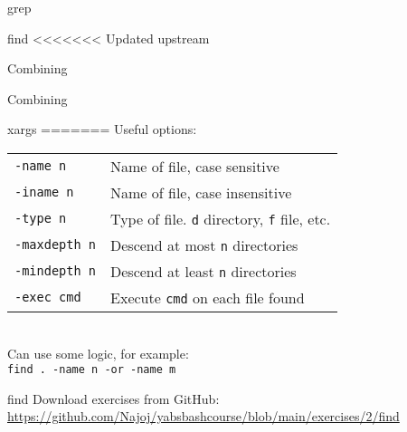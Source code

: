 \documentclass{beamer}
\let\tt\texttt
\begin{document}
\begin{frame}{grep}
\begin{frame}{find}
<<<<<<< Updated upstream
\end{frame}

\begin{frame}{Combining}
\end{frame}

\begin{frame}{Combining}
\end{frame}

\begin{frame}{xargs}
=======
        Useful options:\\
        \begin{tabular}{| l | l}
                \hline
                \tt{-name n}     &   Name of file, case sensitive \\
                \tt{-iname n}    &   Name of file, case insensitive \\
                \tt{-type n}     &   Type of file. \tt{d} directory, \tt{f} file, etc. \\
                \tt{-maxdepth n} &   Descend at most \tt{n} directories \\
                \tt{-mindepth n} &   Descend at least \tt{n} directories \\
                \tt{-exec cmd }  &   Execute \tt{cmd} on each file found \\
                \hline
        \end{tabular} \\
        \medskip
        Can use some logic, for example: \\
        \tt{find . -name n -or -name m}
\end{frame}

\begin{frame}{find}
        Download exercises from GitHub: \\
        \url{https://github.com/Najoj/yabsbashcourse/blob/main/exercises/2/find}
\end{frame}


\end{frame}
\end{document}
